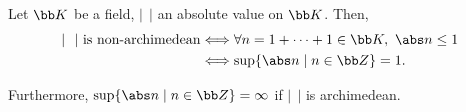 
Let $\bb K$ be a field, $|\ \ |$ an absolute value on $\bb K$. Then,
\begin{align*}
|\ \ |\ \text{is non-archimedean} &\Longleftrightarrow \forall n = 1 + \dotsb + 1 \in \bb K,\ \abs n \le 1 \\
&\Longleftrightarrow \sup \{ \abs n \mid n \in \bb Z \} = 1.
\end{align*}

Furthermore, $\sup \{ \abs n \mid n \in \bb Z \} = \infty$ if $|\ \ |$ is archimedean.　
